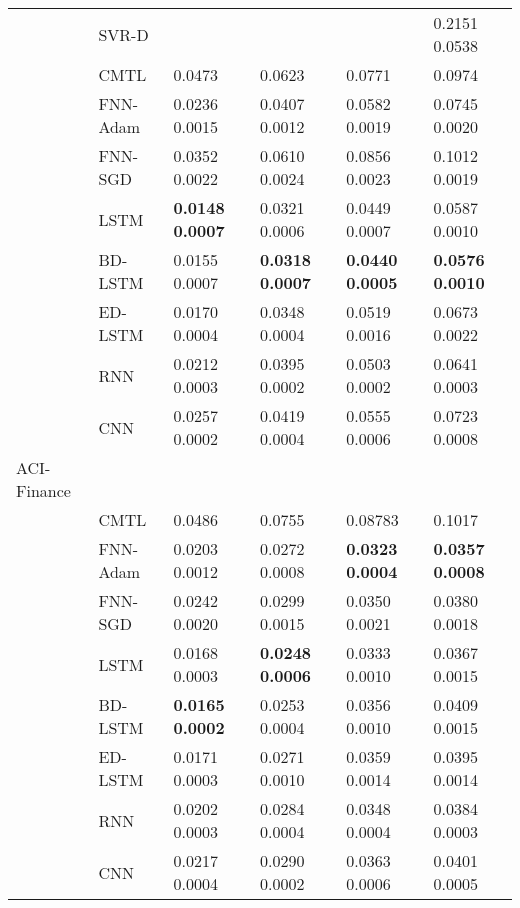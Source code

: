 \documentclass{ieeeaccess}
\begin{document}
\begin{table*}[htbp!]
\begin{tabular}{llllll}
 & SVR-D \cite{zhang2013iterated} &   	&   &	 & 0.2151  0.0538 \\
 
 
&CMTL \cite{chandra2017CMTLMulti} &   0.0473 &  0.0623  &0.0771	 & 0.0974  \\ 

&FNN-Adam & 0.0236	0.0015     	&0.0407	0.0012        &	0.0582	0.0019       &0.0745	0.0020\\

&FNN-SGD  &  0.0352	0.0022    	& 0.0610	0.0024       &	0.0856	0.0023       &0.1012	0.0019\\

&LSTM   &   \textbf{0.0148	0.0007 }  	& 0.0321	0.0006       &	0.0449	0.0007       &0.0587	0.0010\\

&BD-LSTM   &  0.0155	0.0007    	&   \textbf{0.0318	0.0007}     &\textbf{0.0440	0.0005}	       &\textbf{0.0576	0.0010}\\

&ED-LSTM   &   0.0170	0.0004   	& 0.0348	0.0004       &0.0519	0.0016	       &0.0673	0.0022\\

&RNN  &  0.0212	0.0003    	& 0.0395	0.0002       &0.0503	0.0002	       &0.0641	0.0003\\

&CNN &   0.0257	0.0002   	& 	0.0419	0.0004       &	0.0555	0.0006       &0.0723	0.0008\\
 \hline


 
 

ACI-Finance &    	  &	 &\\

&CMTL \cite{chandra2017CMTLMulti} &  0.0486  &  0.0755  &0.08783&0.1017  \\ 

&FNN-Adam & 0.0203   0.0012     	&  0.0272   0.0008       &\textbf{0.0323   0.0004}	       &\textbf{0.0357   0.0008}\\

&FNN-SGD  &   0.0242    0.0020 	&  0.0299    0.0015       &0.0350   0.0021	       &0.0380    0.0018\\

&LSTM   & 0.0168    0.0003    	& \textbf{0.0248    0.0006}      &0.0333   0.0010	       &0.0367   0.0015 \\

&BD-LSTM   &   \textbf{0.0165   0.0002}  	&  0.0253   0.0004     &0.0356  0.0010& 0.0409   0.0015\\

&ED-LSTM   &   0.0171   0.0003     	&  0.0271  0.0010       & 0.0359   0.0014 	       &0.0395   0.0014\\

&RNN  &   0.0202   0.0003   	&  0.0284  0.0004     &0.0348  0.0004 	       & 0.0384   0.0003\\

&CNN &  0.0217	0.0004   	&   0.0290	0.0002    &0.0363	0.0006	       & 0.0401	0.0005\\
\hline
\end{tabular}
\end{table*}
\end{document}
